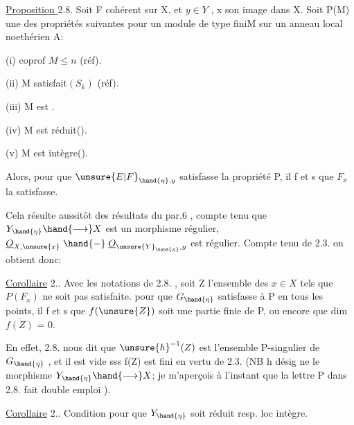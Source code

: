 
\uline{Proposition }2.8.  Soit F cohérent sur X, et  $y\in Y$ , x son image
dans X.   Soit P(M) une des propriétés suivantes pour
un module de type finiM sur un anneau local noethérien A:

(i)   coprof $M\leqslant n$   (réf).

(ii)  M satisfait$(S_k)$  (réf).

(iii)  M est .

(iv)  M est réduit().

(v)   M est intègre().

Alors, pour que $\unsure{E|F}_{\hand{\eta},y}$ satisfasse la propriété P, il f et s que $F_x$ la
satisfasse.

Cela résulte aussitôt des résultats du par.6 , compte tenu que
 $Y_{\hand{\eta}}\hand{\longrightarrow} X$  est un morphisme régulier,   $\underline{O}_{X,\unsure{x}}\mathrel{\hand{-}} \underline{O}_{\unsure{Y}_{\hand{\eta}},y}$ est
régulier.  Compte tenu de 2.3. on obtient donc:

\uline{Corollaire} 2..  Avec les notations de 2.8. , soit Z l'ensemble
des $x\in X$ tels que $P(F_x)$ ne soit pas satisfaite.  pour que
$G_{\hand{\eta}}$ satisfasse à P en tous les points, il f et s que $f(\unsure{Z})$ soit une
partie finie de P, ou encore que  dim $\overline{f(Z)}$ = 0.

En effet, 2.8. nous dit que $\unsure{h}^{-1}(Z)$ est l'ensemble P-singulier
de $G_{\hand{\eta}}$ , et il est vide sss f(Z) est fini en vertu de 2.3. (NB h désig
\placedmargin{|} ne le morphisme $Y_{\hand{\eta}}\hand{\longrightarrow} X$; je m'aperçois à l'instant que la lettre P
\placedmargin{|} dans 2.8. fait double emploi ).

\placedmargin{|} \uline{Corollaire} 2..  Condition pour que $Y_{\hand{\eta}}$ soit réduit resp. loc intègre.



